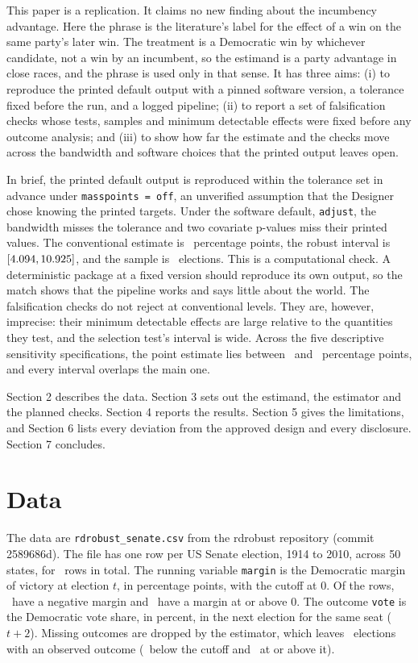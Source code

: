 \documentclass[11pt]{article}
\begin{document}
This paper is a replication. It claims no new finding about the incumbency advantage. Here the phrase is the literature's label for the effect of a win on the same party's later win. The treatment is a Democratic win by whichever candidate, not a win by an incumbent, so the estimand is a party advantage in close races, and the phrase is used only in that sense. It has three aims: (i) to reproduce the printed default output with a pinned software version, a tolerance fixed before the run, and a logged pipeline; (ii) to report a set of falsification checks whose tests, samples and minimum detectable effects were fixed before any outcome analysis; and (iii) to show how far the estimate and the checks move across the bandwidth and software choices that the printed output leaves open.

In brief, the printed default output is reproduced within the tolerance set in advance under \texttt{masspoints = off}, an unverified assumption that the Designer chose knowing the printed targets. Under the software default, \texttt{adjust}, the bandwidth misses the tolerance and two covariate p-values miss their printed values. The conventional estimate is \RdEffect\ percentage points, the robust interval is $[4.094, 10.925]$, and the sample is \RdN\ elections. This is a computational check. A deterministic package at a fixed version should reproduce its own output, so the match shows that the pipeline works and says little about the world. The falsification checks do not reject at conventional levels. They are, however, imprecise: their minimum detectable effects are large relative to the quantities they test, and the selection test's interval is wide. Across the five descriptive sensitivity specifications, the point estimate lies between \RdSensDoubleEst\ and \RdSensHalfEst\ percentage points, and every interval overlaps the main one.

Section 2 describes the data. Section 3 sets out the estimand, the estimator and the planned checks. Section 4 reports the results. Section 5 gives the limitations, and Section 6 lists every deviation from the approved design and every disclosure. Section 7 concludes.

\section{Data}

The data are \texttt{rdrobust\_senate.csv} from the rdrobust repository (commit 2589686d). The file has one row per US Senate election, 1914 to 2010, across 50 states, for \RdDensityN\ rows in total. The running variable \texttt{margin} is the Democratic margin of victory at election $t$, in percentage points, with the cutoff at 0. Of the rows, \RdDensityNLeft\ have a negative margin and \RdDensityNRight\ have a margin at or above 0. The outcome \texttt{vote} is the Democratic vote share, in percent, in the next election for the same seat ($t+2$). Missing outcomes are dropped by the estimator, which leaves \RdN\ elections with an observed outcome (\RdNLeft\ below the cutoff and \RdNRight\ at or above it).
\end{document}
